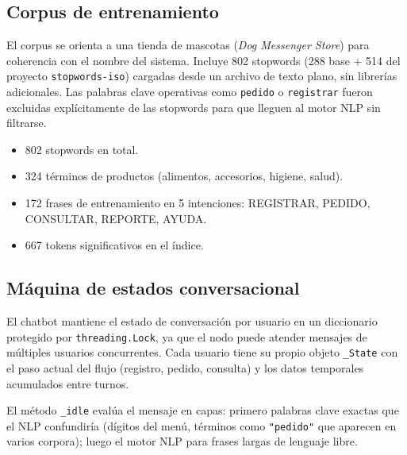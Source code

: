 \documentclass[12pt,a4paper]{article}
\begin{document}
\subsection{Corpus de entrenamiento}

El corpus se orienta a una tienda de mascotas (\emph{Dog Messenger Store})
para coherencia con el nombre del sistema. Incluye 802 stopwords (288
base + 514 del proyecto \texttt{stopwords-iso}) cargadas desde un archivo
de texto plano, sin librerías adicionales. Las palabras clave operativas
como \texttt{pedido} o \texttt{registrar} fueron excluidas explícitamente
de las stopwords para que lleguen al motor NLP sin filtrarse.

\begin{itemize}
  \item 802 stopwords en total.
  \item 324 términos de productos (alimentos, accesorios, higiene, salud).
  \item 172 frases de entrenamiento en 5 intenciones: REGISTRAR, PEDIDO,
    CONSULTAR, REPORTE, AYUDA.
  \item 667 tokens significativos en el índice.
\end{itemize}

\subsection{Máquina de estados conversacional}

El chatbot mantiene el estado de conversación por usuario en un diccionario
protegido por \texttt{threading.Lock}, ya que el nodo puede atender mensajes
de múltiples usuarios concurrentes. Cada usuario tiene su propio objeto
\texttt{\_State} con el paso actual del flujo (registro, pedido, consulta)
y los datos temporales acumulados entre turnos.

El método \texttt{\_idle} evalúa el mensaje en capas: primero palabras clave
exactas que el NLP confundiría (dígitos del menú, términos como
\texttt{"pedido"} que aparecen en varios corpora); luego el motor NLP para
frases largas de lenguaje libre.
\end{document}
